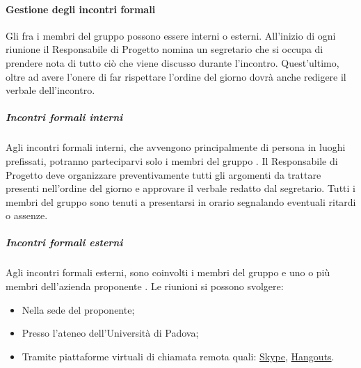 \paragraph{Gestione degli incontri formali}
Gli  fra i membri del gruppo possono essere interni o esterni.
All’inizio di ogni riunione il Responsabile di Progetto nomina un segretario che si occupa di prendere nota di tutto ciò che viene discusso durante l’incontro.
Quest’ultimo, oltre ad avere l’onere di far rispettare l’ordine del giorno dovrà anche redigere il verbale dell’incontro.

\subparagraph*{Incontri formali interni}
Agli incontri formali interni, che avvengono principalmente di persona in luoghi prefissati, potranno parteciparvi solo i membri del gruppo \Gruppo{}.
Il Responsabile di Progetto deve organizzare preventivamente tutti gli argomenti da trattare presenti nell’ordine del giorno e approvare il verbale redatto dal segretario.
Tutti i membri del gruppo sono tenuti a presentarsi in orario segnalando eventuali ritardi o assenze.

\subparagraph*{Incontri formali esterni}
Agli incontri formali esterni, sono coinvolti i membri del gruppo \Gruppo{} e uno o più membri dell'azienda proponente \Proponente{}.
Le riunioni si possono svolgere:
\begin{itemize}
	\item Nella sede del proponente;
	\item Presso l’ateneo dell’Università di Padova;
	\item Tramite piattaforme virtuali di chiamata remota quali: \href{https://www.skype.com/it/}{Skype}, \href{https://hangouts.google.com/}{Hangouts}.
\end{itemize}

